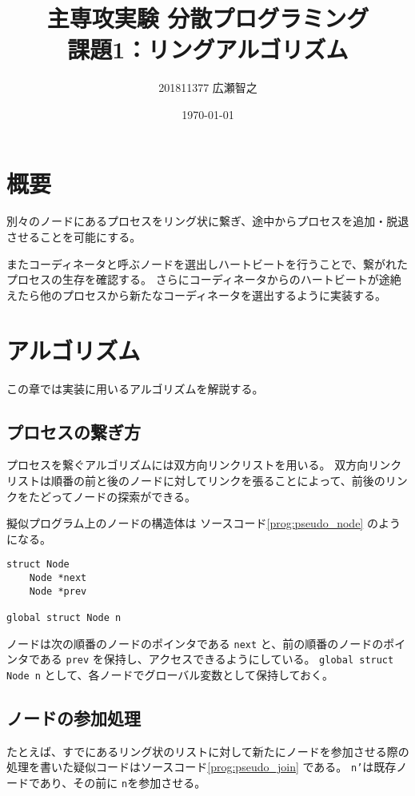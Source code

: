 \documentclass[a4paper]{jlreq}
\title{主専攻実験 分散プログラミング \\課題1：リングアルゴリズム}
\author{201811377 広瀬智之}
\date{\today}
\begin{document}
\maketitle

\section{概要}

別々のノードにあるプロセスをリング状に繋ぎ、途中からプロセスを追加・脱退させることを可能にする。

またコーディネータと呼ぶノードを選出しハートビートを行うことで、繋がれたプロセスの生存を確認する。
さらにコーディネータからのハートビートが途絶えたら他のプロセスから新たなコーディネータを選出するように実装する。

\section{アルゴリズム}

この章では実装に用いるアルゴリズムを解説する。

\subsection{プロセスの繋ぎ方}

プロセスを繋ぐアルゴリズムには双方向リンクリストを用いる。
双方向リンクリストは順番の前と後のノードに対してリンクを張ることによって、前後のリンクをたどってノードの探索ができる。

擬似プログラム上のノードの構造体は ソースコード\ref{prog:pseudo_node} のようになる。

\begin{lstlisting}[label=prog:pseudo_node,caption=ノードを表す擬似的な構造体]
struct Node
    Node *next
    Node *prev

global struct Node n
\end{lstlisting}

ノードは次の順番のノードのポインタである \texttt{next} と、前の順番のノードのポインタである \texttt{prev} を保持し、アクセスできるようにしている。
\texttt{global struct Node n} として、各ノードでグローバル変数として保持しておく。

\subsection{ノードの参加処理}

たとえば、すでにあるリング状のリストに対して新たにノードを参加させる際の処理を書いた疑似コードはソースコード\ref{prog:pseudo_join} である。
\texttt{n'}は既存ノードであり、その前に \texttt{n}を参加させる。
\end{document}
